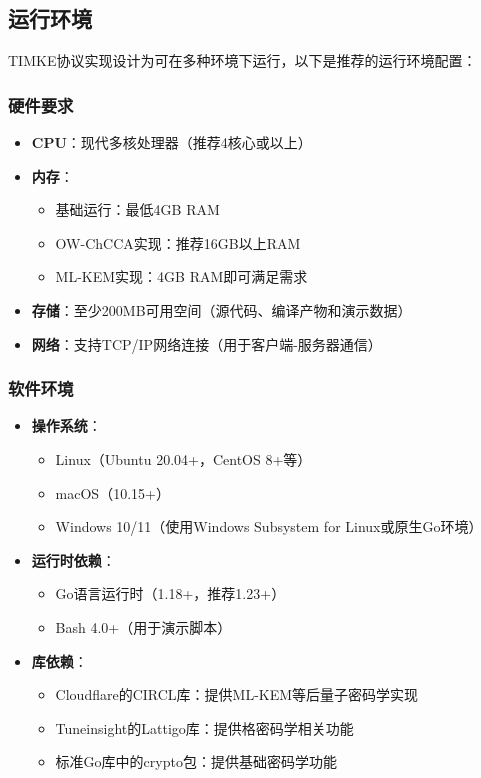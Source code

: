 \subsection{运行环境}

TIMKE协议实现设计为可在多种环境下运行，以下是推荐的运行环境配置：

\subsubsection{硬件要求}

\begin{itemize}
    \item \textbf{CPU}：现代多核处理器（推荐4核心或以上）
    \item \textbf{内存}：
    \begin{itemize}
        \item 基础运行：最低4GB RAM
        \item OW-ChCCA实现：推荐16GB以上RAM
        \item ML-KEM实现：4GB RAM即可满足需求
    \end{itemize}
    \item \textbf{存储}：至少200MB可用空间（源代码、编译产物和演示数据）
    \item \textbf{网络}：支持TCP/IP网络连接（用于客户端-服务器通信）
\end{itemize}

\subsubsection{软件环境}

\begin{itemize}
    \item \textbf{操作系统}：
    \begin{itemize}
        \item Linux（Ubuntu 20.04+，CentOS 8+等）
        \item macOS（10.15+）
        \item Windows 10/11（使用Windows Subsystem for Linux或原生Go环境）
    \end{itemize}
    
    \item \textbf{运行时依赖}：
    \begin{itemize}
        \item Go语言运行时（1.18+，推荐1.23+）
        \item Bash 4.0+（用于演示脚本）
    \end{itemize}
    
    \item \textbf{库依赖}：
    \begin{itemize}
        \item Cloudflare的CIRCL库：提供ML-KEM等后量子密码学实现
        \item Tuneinsight的Lattigo库：提供格密码学相关功能
        \item 标准Go库中的crypto包：提供基础密码学功能
    \end{itemize}
\end{itemize}

